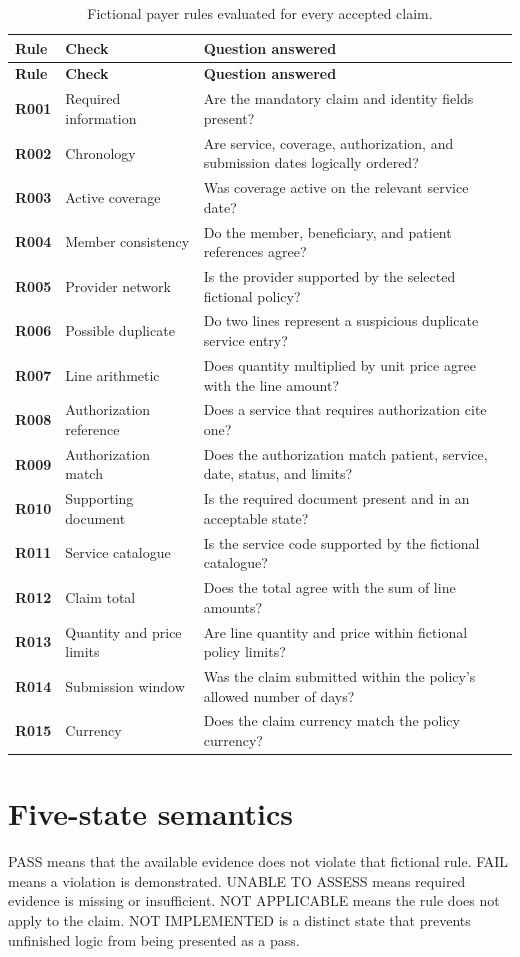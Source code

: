 \documentclass[11pt,a4paper,oneside]{report}
\begin{document}
\begin{longtable}{>{\bfseries}p{14mm} p{42mm} p{85mm}}
\caption{Fictional payer rules evaluated for every accepted claim.}\label{tab:rules}\\
\toprule
\textbf{Rule} & \textbf{Check} & \textbf{Question answered}\\
\midrule
\endfirsthead
\toprule
\textbf{Rule} & \textbf{Check} & \textbf{Question answered}\\
\midrule
\endhead
R001 & Required information & Are the mandatory claim and identity fields present?\\
R002 & Chronology & Are service, coverage, authorization, and submission dates logically ordered?\\
R003 & Active coverage & Was coverage active on the relevant service date?\\
R004 & Member consistency & Do the member, beneficiary, and patient references agree?\\
R005 & Provider network & Is the provider supported by the selected fictional policy?\\
R006 & Possible duplicate & Do two lines represent a suspicious duplicate service entry?\\
R007 & Line arithmetic & Does quantity multiplied by unit price agree with the line amount?\\
R008 & Authorization reference & Does a service that requires authorization cite one?\\
R009 & Authorization match & Does the authorization match patient, service, date, status, and limits?\\
R010 & Supporting document & Is the required document present and in an acceptable state?\\
R011 & Service catalogue & Is the service code supported by the fictional catalogue?\\
R012 & Claim total & Does the total agree with the sum of line amounts?\\
R013 & Quantity and price limits & Are line quantity and price within fictional policy limits?\\
R014 & Submission window & Was the claim submitted within the policy's allowed number of days?\\
R015 & Currency & Does the claim currency match the policy currency?\\
\bottomrule
\end{longtable}

\section{Five-state semantics}
PASS means that the available evidence does not violate that fictional rule. FAIL means a violation is demonstrated. UNABLE TO ASSESS means required evidence is missing or insufficient. NOT APPLICABLE means the rule does not apply to the claim. NOT IMPLEMENTED is a distinct state that prevents unfinished logic from being presented as a pass.
\end{document}
